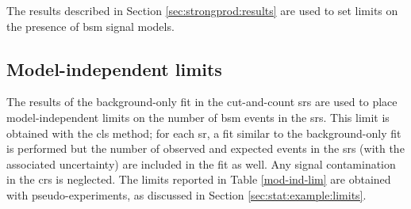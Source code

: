 The results described in Section \ref{sec:strongprod:results} are used to set limits on the presence of \gls{bsm} 
signal models. 

\subsection{Model-independent limits}
\label{sec:strong:modelindepUL}

The results of the background-only fit in the cut-and-count \glspl{sr}
are used to place model-independent limits on the number of \gls{bsm} events in the \glspl{sr}. 
This limit is obtained with the \gls{cls} method; for each \gls{sr}, a fit similar to the background-only fit is performed 
but the number of observed and expected events in the \glspl{sr} (with the associated uncertainty) are included in the fit as well. 
Any signal contamination in the \glspl{cr} is neglected. 
The limits reported in Table \ref{mod-ind-lim} are obtained with pseudo-experiments, as discussed in Section \ref{sec:stat:example:limits}.

